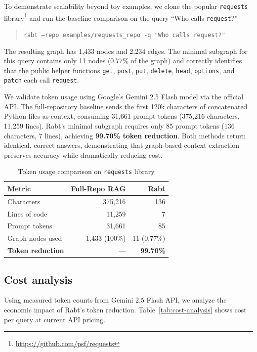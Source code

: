 \documentclass[11pt]{article}
\begin{document}
To demonstrate scalability beyond toy examples, we clone the popular \texttt{requests} library\footnote{\url{https://github.com/psf/requests}} and run the baseline comparison on the query ``Who calls \texttt{request}?''
\begin{quote}
\texttt{rabt --repo examples/requests\_repo -q "Who calls request?"}
\end{quote}

The resulting graph has 1,433 nodes and 2,234 edges.
The minimal subgraph for this query contains only 11 nodes (0.77\% of the graph) and correctly identifies that the public helper functions \texttt{get}, \texttt{post}, \texttt{put}, \texttt{delete}, \texttt{head}, \texttt{options}, and \texttt{patch} each call \texttt{request}.

We validate token usage using Google's Gemini 2.5 Flash model via the official API.
The full-repository baseline sends the first 120k characters of concatenated Python files as context, consuming 31,661 prompt tokens (375,216 characters, 11,259 lines).
Rabt's minimal subgraph requires only 85 prompt tokens (136 characters, 7 lines), achieving \textbf{99.70\% token reduction}.
Both methods return identical, correct answers, demonstrating that graph-based context extraction preserves accuracy while dramatically reducing cost.

\begin{table}[t]
\centering
\caption{Token usage comparison on \texttt{requests} library}
\label{tab:token-comparison}
\begin{tabular}{@{}lrr@{}}
\toprule
\textbf{Metric} & \textbf{Full-Repo RAG} & \textbf{Rabt} \\
\midrule
Characters & 375,216 & 136 \\
Lines of code & 11,259 & 7 \\
Prompt tokens & 31,661 & 85 \\
Graph nodes used & 1,433 (100\%) & 11 (0.77\%) \\
\textbf{Token reduction} & --- & \textbf{99.70\%} \\
\bottomrule
\end{tabular}
\end{table}

\subsection{Cost analysis}

Using measured token counts from Gemini 2.5 Flash API, we analyze the economic impact of Rabt's token reduction.
Table~\ref{tab:cost-analysis} shows cost per query at current API pricing.
\end{document}

